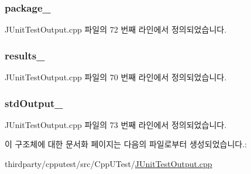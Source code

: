\subsubsection[{\texorpdfstring{package\+\_\+}{package_}}]{ package\+\_\+}\hypertarget{struct_j_unit_test_output_impl_a55d30a9c57a719e169bf5bae2d49c03c}{}\label{struct_j_unit_test_output_impl_a55d30a9c57a719e169bf5bae2d49c03c}


J\+Unit\+Test\+Output.\+cpp 파일의 72 번째 라인에서 정의되었습니다.

\subsubsection[{\texorpdfstring{results\+\_\+}{results_}}]{ results\+\_\+}\hypertarget{struct_j_unit_test_output_impl_a4efee5ceef62d8079916e9bd0beb9ba0}{}\label{struct_j_unit_test_output_impl_a4efee5ceef62d8079916e9bd0beb9ba0}


J\+Unit\+Test\+Output.\+cpp 파일의 70 번째 라인에서 정의되었습니다.

\subsubsection[{\texorpdfstring{std\+Output\+\_\+}{stdOutput_}}]{ std\+Output\+\_\+}\hypertarget{struct_j_unit_test_output_impl_acbb0309e620aa28379f1040380eb6378}{}\label{struct_j_unit_test_output_impl_acbb0309e620aa28379f1040380eb6378}


J\+Unit\+Test\+Output.\+cpp 파일의 73 번째 라인에서 정의되었습니다.



이 구조체에 대한 문서화 페이지는 다음의 파일로부터 생성되었습니다.\+:\begin{DoxyCompactItemize}
\item 
thirdparty/cpputest/src/\+Cpp\+U\+Test/\hyperlink{_j_unit_test_output_8cpp}{J\+Unit\+Test\+Output.\+cpp}\end{DoxyCompactItemize}
